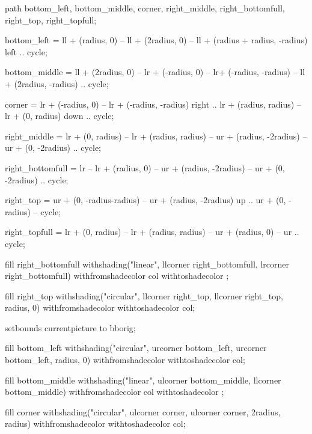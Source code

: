 	path bottom_left, bottom_middle, corner, right_middle, right_bottomfull, right_top, right_topfull;

	bottom_left = ll + (radius, 0) -- ll + (2radius, 0) --
	ll + (radius + radius, -radius) {left} .. cycle;

	bottom_middle = ll + (2radius, 0) -- lr + (-radius, 0) --
		lr+ (-radius, -radius) -- ll + (2radius, -radius) .. cycle;

	corner = lr + (-radius, 0) -- lr + (-radius, -radius) {right} ..
		lr + (radius, radius) -- lr + (0, radius) {down} .. cycle;

	right_middle = lr + (0, radius) -- lr + (radius, radius) --
		ur + (radius, -2radius) -- ur + (0, -2radius) .. cycle;

	right_bottomfull = lr -- lr + (radius, 0) --
		ur + (radius, -2radius) -- ur + (0, -2radius) .. cycle;

	right_top = ur + (0, -radius-radius) -- ur + (radius, -2radius) {up} ..
		ur + (0, -radius) -- cycle;

	right_topfull = lr + (0, radius) -- lr + (radius, radius) --
		ur + (radius, 0) -- ur .. cycle;
\stopuseMPgraphic



	fill right_bottomfull
		withshading("linear", llcorner right_bottomfull, lrcorner right_bottomfull)
		withfromshadecolor col
		withtoshadecolor   ;

	fill right_top
		withshading("circular", llcorner right_top, llcorner right_top, radius, 0)
		withfromshadecolor 
		withtoshadecolor   col;

	setbounds currentpicture to bborig;
\stopuseMPgraphic



	fill bottom_left
		withshading("circular", urcorner bottom_left, urcorner bottom_left, radius, 0)
		withfromshadecolor 
		withtoshadecolor   col;

	fill bottom_middle
		withshading("linear", ulcorner bottom_middle, llcorner bottom_middle)
		withfromshadecolor col
		withtoshadecolor   ;

	fill corner
		withshading("circular", ulcorner corner, ulcorner corner, 2radius, radius)
		withfromshadecolor 
		withtoshadecolor   col;

